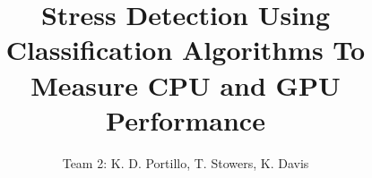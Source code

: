 \documentclass{IEEEtran}
\begin{document}
 
\title{Stress Detection Using Classification Algorithms To Measure CPU and GPU Performance}
\author{Team 2: K. D. Portillo, T. Stowers, K. Davis}
\maketitle
{}





\end{document}
